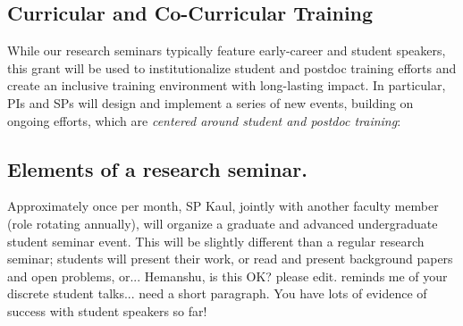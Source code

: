 \documentclass[11pt]{NSFamsart}
\begin{document}
\subsection{Curricular and Co-Curricular Training}

While our research seminars  typically feature early-career and student speakers, this grant will be used to institutionalize student and postdoc training  efforts and create an inclusive training environment with long-lasting impact. %
In particular,  PIs and SPs will  design and implement a  series of new events, building on  ongoing efforts, which are \emph{centered around student and postdoc training}: 

\subsection*{Elements of a research seminar.} 
Approximately once per month, SP Kaul, jointly with another  faculty member (role rotating annually), will organize a graduate and advanced undergraduate student seminar event. This will be slightly different than a regular research seminar; students will present their work, or read and present background papers and open problems, or...{\color{magenta} Hemanshu, is this OK? please edit. reminds me of your discrete student talks... need a short paragraph. You have  lots of evidence of success with student speakers so far!} 
\end{document}
